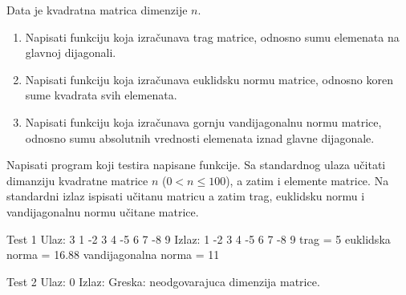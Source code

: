 \begin{Exercise}[label=314]
Data je kvadratna matrica dimenzije $n$.
\begin{enumerate}
\item Napisati funkciju koja izračunava trag matrice, odnosno sumu elemenata na glavnoj dijagonali.
\item Napisati funkciju koja izračunava euklidsku normu matrice, odnosno koren sume kvadrata svih elemenata.
\item Napisati funkciju koja izračunava gornju vandijagonalnu normu matrice, odnosno sumu absolutnih vrednosti elemenata iznad glavne dijagonale.
\end{enumerate}
Napisati program koji testira napisane funkcije. Sa standardnog
ulaza učitati dimanziju kvadratne matrice $n$
($0 < n \leq 100$), a zatim i elemente matrice. Na standardni izlaz
ispisati učitanu matricu a zatim trag, euklidsku normu i vandijagonalnu normu 
učitane matrice.

\begin{maxitest}
\begin{test}{Test 1}
Ulaz:  3 1 -2 3 4 -5 6 7 -8 9
Izlaz: 1 -2 3 
       4 -5 6 
       7 -8 9
       trag = 5
       euklidska norma = 16.88
       vandijagonalna norma = 11
\end{test}
\end{maxitest}

\begin{maxitest}
\begin{test}{Test 2}
Ulaz:  0
Izlaz: Greska: neodgovarajuca dimenzija matrice. 
\end{test}
\end{maxitest}
\end{Exercise}
\begin{Answer}[ref=314]
\end{Answer}

